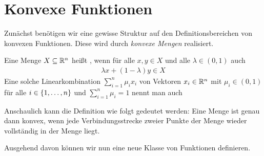 \documentclass[ %
ngerman, %
a4paper, 
12pt,%
sectionreset, %
chapterstyle=framed, %
sectionstyle=pure, %
titlefont=osfamily %
]{../texmf/tex/latex/mathscriptMathTUD/mathscriptMathTUD}
\institute{Numerik}
\begin{document}
    

\setcounter{chapter}{1}

\chapter{Konvexe Funktionen}


Zunächst benötigen wir eine gewisse Struktur auf den Definitionsbereichen von konvexen Funktionen. Diese wird durch \textit{konvexe Mengen} realisiert.

\begin{definition}
	Eine Menge $X \subseteq \mathbb{R}^n$ heißt , wenn für alle $x,y \in X$ und alle $\lambda \in (0,1)$ auch
	\begin{align} \label{eq: def_konvexkombination}
		\lambda x + (1 - \lambda) y \in X
	\end{align}
	Eine solche Linearkombination $\sum_{i=1}^{n} \mu_i x_i$ von Vektoren $x_i \in \mathbb{R}^n$ mit $\mu_i \in (0,1)$ für alle $i \in \left\{ 1,\dots,n \right\}$ und $\sum_{i=1}^n \mu_i = 1$ nennt man auch 
\end{definition}

Anschaulich kann die Definition wie folgt gedeutet werden:
Eine Menge ist genau dann konvex, wenn jede Verbindungsstrecke zweier Punkte der Menge wieder vollständig in der Menge liegt.


Ausgehend davon können wir nun eine neue Klasse von Funktionen definieren.
\end{document}
